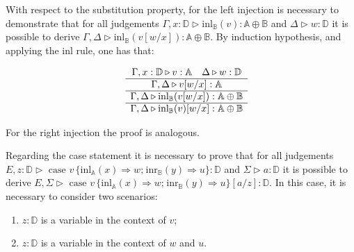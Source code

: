 With respect to the substitution property, for the left injection is necessary to demonstrate that for all judgements $\Gamma, x:\mathbb{D} \triangleright \text{inl}_{\mathbb{B}}(v):  \mathbb{A} \oplus \mathbb{B}$ and $\Delta \triangleright w: \mathbb{D}$ it is possible to derive $\Gamma, \Delta \triangleright \text{inl}_{\mathbb{B}}(v[w/x]):  \mathbb{A} \oplus \mathbb{B}$. By induction hypothesis,  and applying the inl rule, one has that:
\begin{figure} [H]
  \begin{equation*}
  \begin{split}
  \begin{aligned}
  &
  \begin{minipage}[t]{0.3\textwidth}
  $\begin{array}{c}
    \Gamma, x:\mathbb{D} \triangleright v: \mathbb{A} \quad \Delta \triangleright w: \mathbb{D}  \\  
      \hline
      \Gamma,  \Delta \triangleright v [w/x]: \mathbb{A}  \\   
      \hline
       \Gamma,  \Delta \triangleright \text{inl}_{\mathbb{B}}(v[w/x]):  \mathbb{A} \oplus \mathbb{B}  \\
       \hline 
       \Gamma,  \Delta \triangleright \text{inl}_{\mathbb{B}}(v) [w/x]:  \mathbb{A} \oplus \mathbb{B}  
  \end{array}
  $
  \end{minipage}
  \end{aligned}
  \end{split}
  \end{equation*}
  \end{figure}

  For the right injection the proof is analogous.
  
  Regarding the case statement it is necessary to prove that for all judgements $E, z:\mathbb{D} \triangleright  \text{ case } v \hspace{2pt} \{\text{inl}_{\mathbb{A}}  (x) \Rightarrow w ; \hspace{1pt} \text{inr}_{\mathbb{B}}  (y) \Rightarrow u\}: \mathbb{D}$ and $\Sigma\triangleright a: \mathbb{D}$ it is possible to derive $ E, \Sigma  \triangleright \text{ case } v \hspace{2pt} \{\text{inl}_{\mathbb{A}}  (x) \Rightarrow w ; \hspace{1pt} \text{inr}_{\mathbb{B}}  (y) \Rightarrow u\}[a/z]: \mathbb{D}$. In this case, it is necessary to consider two scenarios:
  \begin{enumerate}
    \item $z:\mathbb{D}$ is a variable in the context of $v$;
    \item $z:\mathbb{D}$ is a variable in the context of $w$ and $u$.
  \end{enumerate}
  
